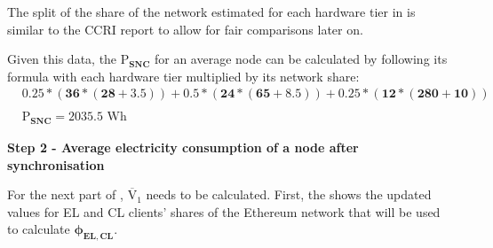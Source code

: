 The split of the share of the network estimated for each hardware tier in  is similar to the CCRI report \cite{CryptoCarbonRatingsInstitute2022TheNetwork} to allow for fair comparisons later on. 

Given this data, the $\boldsymbol{\mathrm{P}_{SNC}}$ for an average node can be calculated by following its formula with each hardware tier multiplied by its network share: \newline
\begin{align}
    &\boldsymbol{0.25*(36*(28 + 3.5)) + 0.5*(24*(65+8.5)) + 0.25*(12*(280+10))} \nonumber\\ \nonumber \\
    &\boldsymbol{{\mathrm{P}_{SNC}} = 2035.5} \text{ Wh} \nonumber
\end{align}



\textbf{Step 2 - Average electricity consumption of a node after synchronisation}
\label{postSyncEnergyImplementation}

For the next part of , $\boldsymbol{\mathrm{\overline{V}_{1}}}$ needs to be calculated. First, the  shows the updated values for EL and CL clients' shares of the Ethereum network that will be used to calculate $\boldsymbol{\phi_{EL,CL}}$.  

